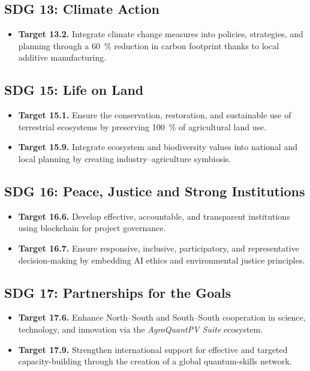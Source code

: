 \documentclass[12pt, a4paper]{article}
\begin{document}
\subsection{SDG 13: Climate Action}
\begin{itemize}
    \item \textbf{Target 13.2.} Integrate climate change measures into policies, strategies, and planning through a \SI{60}{\percent} reduction in carbon footprint thanks to local additive manufacturing.
\end{itemize}

\subsection{SDG 15: Life on Land}
\begin{itemize}
    \item \textbf{Target 15.1.} Ensure the conservation, restoration, and sustainable use of terrestrial ecosystems by preserving \SI{100}{\percent} of agricultural land use.

    \item \textbf{Target 15.9.} Integrate ecosystem and biodiversity values into national and local planning by creating industry–agriculture symbiosis.
\end{itemize}

\subsection{SDG 16: Peace, Justice and Strong Institutions}
\begin{itemize}
    \item \textbf{Target 16.6.} Develop effective, accountable, and transparent institutions using blockchain for project governance.

    \item \textbf{Target 16.7.} Ensure responsive, inclusive, participatory, and representative decision-making by embedding AI ethics and environmental justice principles.
\end{itemize}

\subsection{SDG 17: Partnerships for the Goals}
\begin{itemize}
    \item \textbf{Target 17.6.} Enhance North–South and South–South cooperation in science, technology, and innovation via the \textit{AgroQuantPV Suite} ecosystem.

    \item \textbf{Target 17.9.} Strengthen international support for effective and targeted capacity-building through the creation of a global quantum-skills network.
\end{itemize}
\end{document}
